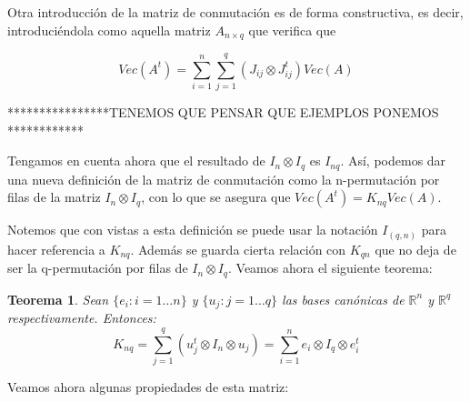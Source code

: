 \documentclass{article}
\theoremstyle{theorem-style}  %
\newtheorem{theorem}{Teorema}[section]  %
\theoremstyle{definition-style}
\theoremstyle{example-style}
\theoremstyle{exercise-style}
\begin{document}
	Otra introducción de la matriz de conmutación es de forma constructiva, es decir, introduciéndola como aquella matriz $A_{n \times q}$ que verifica que
	
	$$
	Vec(A^t) = \sum_{i=1}^{n} \sum_{j=1}^{q}(J_{ij} \otimes J_{ij}^t) Vec(A)
	$$
	
	****************TENEMOS QUE PENSAR QUE EJEMPLOS PONEMOS ************
	
	Tengamos en cuenta ahora que el resultado de $I_n \otimes I_q$ es $I_{nq}$. Así, podemos dar una nueva definición de la matriz de conmutación como la n-permutación por filas de la matriz $I_n \otimes I_q$, con lo que se asegura que  $Vec(A^t)= K_{nq}Vec(A)$.
	
	Notemos que con vistas a esta definición se puede usar la notación $I_{(q,n)}$ para hacer referencia a $K_{nq}$. Además se guarda cierta relación con $K_{qn}$ que no deja de ser la q-permutación por filas de $I_n \otimes I_q$. Veamos ahora el siguiente teorema:
	
	\begin{theorem}
		Sean $\{e_i:i=1 \dots n\}$ y $\{u_j:j=1 \dots q\}$ las bases canónicas de $\mathbb{R}^n$ y $\mathbb{R}^q$ respectivamente. Entonces:
		$$ K_{nq}=\sum_{j=1}^{q} (u_j^t \otimes  I_n \otimes u_j) = \sum_{i=1}^{n} e_i \otimes I_q \otimes e_i^t$$
	\end{theorem}
	
	Veamos ahora algunas propiedades de esta matriz:
	
\end{document}
